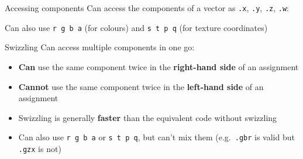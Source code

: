 \begin{frame}{Accessing components}
	\pause Can access the components of a vector as \lstinline{.x}, \lstinline{.y}, \lstinline{.z}, \lstinline{.w}:
	
	\pause Can also use \lstinline{r g b a} (for colours) and \lstinline{s t p q} (for texture coordinates)
\end{frame}

\begin{frame}{Swizzling}
	\pause Can access multiple components in one go:
	
	\begin{itemize}
		\pause \item\textbf{Can} use the same component twice in the \textbf{right-hand side} of an assignment 
		\pause \item\textbf{Cannot} use the same component twice in the \textbf{left-hand side} of an assignment 
		\pause \item Swizzling is generally \textbf{faster} than the equivalent code without swizzling
		\pause \item Can also use  \lstinline{r g b a} or \lstinline{s t p q}, but can't mix them
			(e.g.\ \lstinline{.gbr} is valid but \lstinline{.gzx} is not)
	\end{itemize}
\end{frame}
